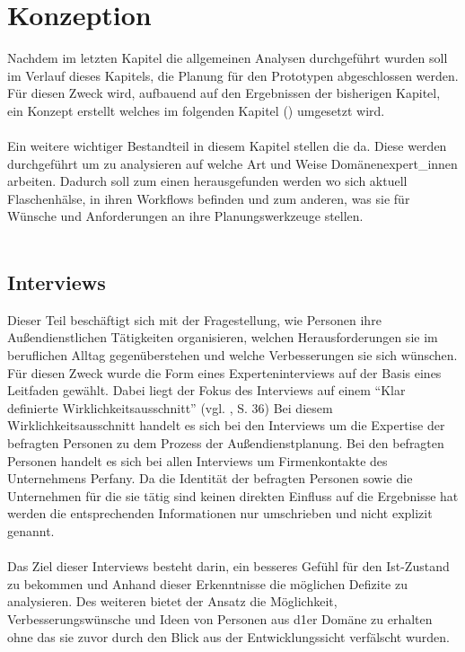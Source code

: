 \documentclass[Bachelorarbeit.tex]{subfiles}
\begin{document}
\chapter{Konzeption}
\label{chap:entwicklung}
Nachdem im letzten Kapitel die allgemeinen Analysen durchgeführt wurden soll im Verlauf dieses Kapitels, die Planung für den Prototypen abgeschlossen werden.
Für diesen Zweck wird, aufbauend auf den Ergebnissen der bisherigen Kapitel, ein Konzept erstellt welches im folgenden Kapitel () umgesetzt wird. \\
\\
Ein weitere wichtiger Bestandteil in diesem Kapitel stellen die  da.
Diese  werden durchgeführt um zu analysieren auf welche Art und Weise  Domänenexpert\_innen arbeiten.
Dadurch soll zum einen herausgefunden werden wo sich aktuell Flaschenhälse, in ihren Workflows befinden und zum anderen, was sie für Wünsche und Anforderungen an ihre Planungswerkzeuge stellen.\\
\\

\section{Interviews}
\label{chap:analyse:sec:interviews}
Dieser Teil beschäftigt sich mit der Fragestellung, wie Personen ihre Außendienstlichen Tätigkeiten organisieren, welchen Herausforderungen sie im beruflichen Alltag gegenüberstehen und welche Verbesserungen sie sich wünschen. 
Für diesen Zweck wurde die Form eines Experteninterviews auf der Basis eines Leitfaden gewählt.
Dabei liegt der Fokus des Interviews auf einem "`Klar definierte Wirklichkeitsausschnitt"' (vgl. \cite{Mayer2006}, S. 36)
Bei diesem Wirklichkeitsausschnitt handelt es sich bei den Interviews um die Expertise der befragten Personen zu dem Prozess der Außendienstplanung.
Bei den befragten Personen handelt es sich bei allen Interviews um Firmenkontakte des Unternehmens Perfany.
Da die Identität der befragten Personen sowie die Unternehmen für die sie tätig sind keinen direkten Einfluss auf die Ergebnisse hat werden die entsprechenden Informationen nur umschrieben und nicht explizit genannt.\\
\\
Das Ziel dieser Interviews besteht darin, ein besseres Gefühl für den Ist-Zustand zu bekommen und Anhand dieser Erkenntnisse die möglichen Defizite zu analysieren.
Des weiteren bietet der Ansatz die Möglichkeit, Verbesserungswünsche und Ideen von Personen aus d1er Domäne zu erhalten ohne das sie zuvor durch den Blick aus der Entwicklungssicht verfälscht wurden.
\end{document}
